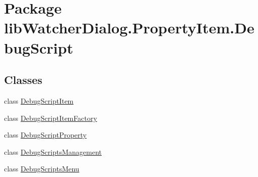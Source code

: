 \hypertarget{namespacelib_watcher_dialog_1_1_property_item_1_1_debug_script}{\section{Package lib\+Watcher\+Dialog.\+Property\+Item.\+Debug\+Script}
\label{namespacelib_watcher_dialog_1_1_property_item_1_1_debug_script}
}
\subsection*{Classes}
\begin{DoxyCompactItemize}
\item 
class \hyperlink{classlib_watcher_dialog_1_1_property_item_1_1_debug_script_1_1_debug_script_item}{Debug\+Script\+Item}
\item 
class \hyperlink{classlib_watcher_dialog_1_1_property_item_1_1_debug_script_1_1_debug_script_item_factory}{Debug\+Script\+Item\+Factory}
\item 
class \hyperlink{classlib_watcher_dialog_1_1_property_item_1_1_debug_script_1_1_debug_script_property}{Debug\+Script\+Property}
\item 
class \hyperlink{classlib_watcher_dialog_1_1_property_item_1_1_debug_script_1_1_debug_scripts_management}{Debug\+Scripts\+Management}
\item 
class \hyperlink{classlib_watcher_dialog_1_1_property_item_1_1_debug_script_1_1_debug_scripts_menu}{Debug\+Scripts\+Menu}
\end{DoxyCompactItemize}

